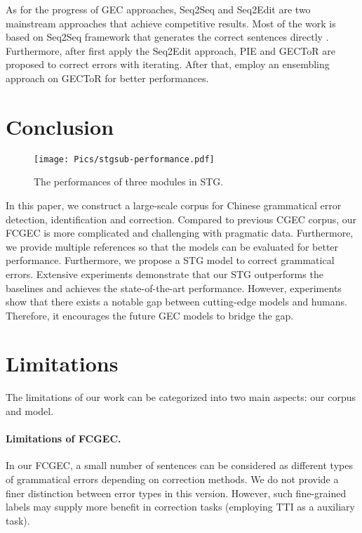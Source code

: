 \documentclass[11pt]{article}
\begin{document}
As for the progress of GEC approaches, Seq2Seq and Seq2Edit are two mainstream approaches that achieve competitive results. Most of the work is based on Seq2Seq framework that generates the correct sentences directly \cite{zhou2019improving,wan2020improving,zhao2020maskgec,kaneko2020encoder}. Furthermore, after \citet{malmi2019encode} first apply the Seq2Edit approach, PIE \cite{awasthi2019parallel} and GECToR \cite{zhang2022mucgec} are proposed to correct errors with iterating. After that, \citet{tarnavskyi2022ensembling} employ an ensembling approach on GECToR for better performances.  
\section{Conclusion}

\begin{figure}[t]
	\centering
	\texttt{[image: Pics/stgsub-performance.pdf]} 
	\caption{The performances of three modules in STG.}
	\label{fig:stg-sub-performance}
\end{figure}
 
In this paper, we construct a large-scale corpus for Chinese grammatical error detection, identification and correction. Compared to previous CGEC corpus, our FCGEC is more complicated and challenging with pragmatic data. Furthermore, we provide multiple references so that the models can be evaluated for better performance. Furthermore, we propose a STG model to correct grammatical errors. Extensive experiments demonstrate that our STG outperforms the baselines and achieves the state-of-the-art performance. However, experiments show that there exists a notable gap between cutting-edge models and humans. Therefore, it encourages the future GEC models to bridge the gap. 
\section*{Limitations}
The limitations of our work can be categorized into two main aspects: our corpus and model.

\paragraph{Limitations of FCGEC.} In our FCGEC, a small number of sentences can be considered as different types of grammatical errors depending on correction methods. We do not provide a finer distinction between error types in this version. However, such fine-grained labels may supply more benefit in correction tasks (employing TTI as a auxiliary task). 
\end{document}
